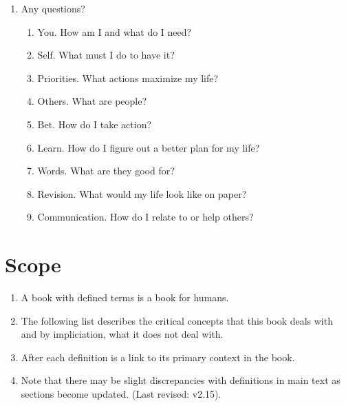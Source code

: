 \documentclass[
]{book}
\providecommand{\tightlist}{%
  \setlength{\itemsep}{0pt}\setlength{\parskip}{0pt}}
\begin{document}
\begin{enumerate}
\def\labelenumi{\arabic{enumi}.}
\setcounter{enumi}{2}
\item
  Any questions?

  \begin{enumerate}
  \def\labelenumii{\arabic{enumii}.}
  \setcounter{enumii}{-1}
  \tightlist
  \item
    You. How am I and what do I need?
  \item
    Self. What must I do to have it?
  \item
    Priorities. What actions maximize my life?
  \item
    Others. What are people?
  \item
    Bet. How do I take action?
  \item
    Learn. How do I figure out a better plan for my life?
  \item
    Words. What are they good for?
  \item
    Revision. What would my life look like on paper?
  \item
    Communication. How do I relate to or help others?
  \end{enumerate}
\end{enumerate}

\hypertarget{scope}{%
\section{Scope}\label{scope}}

\begin{enumerate}
\def\labelenumi{\arabic{enumi}.}
\setcounter{enumi}{3}
\tightlist
\item
  A book with defined terms is a book for humans.
\item
  The following list describes the critical concepts that this book deals with and by impliciation, what it does not deal with.
\item
  After each definition is a link to its primary context in the book.
\item
  Note that there may be slight discrepancies with definitions in main text as sections become updated. (Last revised: v2.15).
\end{enumerate}
\end{document}
